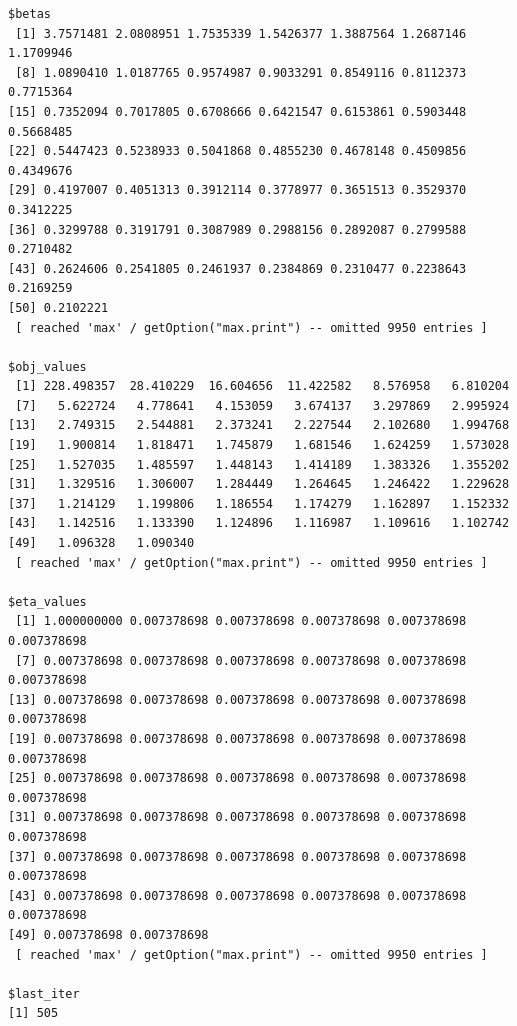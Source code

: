\documentclass[
  letterpaper,
  DIV=11,
  numbers=noendperiod]{scrartcl}
\newenvironment{Shaded}{\begin{snugshade}}{\end{snugshade}}
\newcommand{\DecValTok}[1]{\textcolor[rgb]{0.68,0.00,0.00}{#1}}
\newcommand{\FunctionTok}[1]{\textcolor[rgb]{0.28,0.35,0.67}{#1}}
\newcommand{\NormalTok}[1]{\textcolor[rgb]{0.00,0.23,0.31}{#1}}
\newcommand{\SpecialCharTok}[1]{\textcolor[rgb]{0.37,0.37,0.37}{#1}}
\newcommand{\StringTok}[1]{\textcolor[rgb]{0.13,0.47,0.30}{#1}}
\begin{document}
\begin{verbatim}
$betas
 [1] 3.7571481 2.0808951 1.7535339 1.5426377 1.3887564 1.2687146 1.1709946
 [8] 1.0890410 1.0187765 0.9574987 0.9033291 0.8549116 0.8112373 0.7715364
[15] 0.7352094 0.7017805 0.6708666 0.6421547 0.6153861 0.5903448 0.5668485
[22] 0.5447423 0.5238933 0.5041868 0.4855230 0.4678148 0.4509856 0.4349676
[29] 0.4197007 0.4051313 0.3912114 0.3778977 0.3651513 0.3529370 0.3412225
[36] 0.3299788 0.3191791 0.3087989 0.2988156 0.2892087 0.2799588 0.2710482
[43] 0.2624606 0.2541805 0.2461937 0.2384869 0.2310477 0.2238643 0.2169259
[50] 0.2102221
 [ reached 'max' / getOption("max.print") -- omitted 9950 entries ]

$obj_values
 [1] 228.498357  28.410229  16.604656  11.422582   8.576958   6.810204
 [7]   5.622724   4.778641   4.153059   3.674137   3.297869   2.995924
[13]   2.749315   2.544881   2.373241   2.227544   2.102680   1.994768
[19]   1.900814   1.818471   1.745879   1.681546   1.624259   1.573028
[25]   1.527035   1.485597   1.448143   1.414189   1.383326   1.355202
[31]   1.329516   1.306007   1.284449   1.264645   1.246422   1.229628
[37]   1.214129   1.199806   1.186554   1.174279   1.162897   1.152332
[43]   1.142516   1.133390   1.124896   1.116987   1.109616   1.102742
[49]   1.096328   1.090340
 [ reached 'max' / getOption("max.print") -- omitted 9950 entries ]

$eta_values
 [1] 1.000000000 0.007378698 0.007378698 0.007378698 0.007378698 0.007378698
 [7] 0.007378698 0.007378698 0.007378698 0.007378698 0.007378698 0.007378698
[13] 0.007378698 0.007378698 0.007378698 0.007378698 0.007378698 0.007378698
[19] 0.007378698 0.007378698 0.007378698 0.007378698 0.007378698 0.007378698
[25] 0.007378698 0.007378698 0.007378698 0.007378698 0.007378698 0.007378698
[31] 0.007378698 0.007378698 0.007378698 0.007378698 0.007378698 0.007378698
[37] 0.007378698 0.007378698 0.007378698 0.007378698 0.007378698 0.007378698
[43] 0.007378698 0.007378698 0.007378698 0.007378698 0.007378698 0.007378698
[49] 0.007378698 0.007378698
 [ reached 'max' / getOption("max.print") -- omitted 9950 entries ]

$last_iter
[1] 505
\end{verbatim}

\begin{Shaded}
\end{Shaded}
\end{document}
